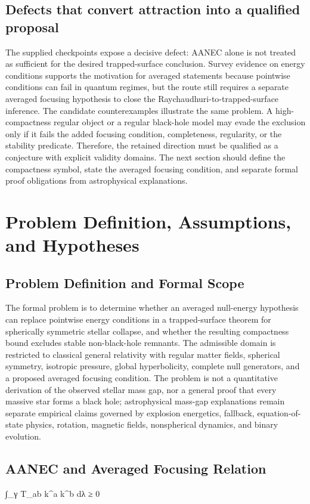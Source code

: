 \documentclass[conference]{IEEEtran}
\begin{document}
\subsection{Defects that convert attraction into a qualified proposal}
The supplied checkpoints expose a decisive defect: AANEC alone is not treated as sufficient for the desired trapped-surface conclusion. Survey evidence on energy conditions supports the motivation for averaged statements because pointwise conditions can fail in quantum regimes, but the route still requires a separate averaged focusing hypothesis to close the Raychaudhuri-to-trapped-surface inference. The candidate counterexamples illustrate the same problem. A high-compactness regular object or a regular black-hole model may evade the exclusion only if it fails the added focusing condition, completeness, regularity, or the stability predicate. Therefore, the retained direction must be qualified as a conjecture with explicit validity domains. The next section should define the compactness symbol, state the averaged focusing condition, and separate formal proof obligations from astrophysical explanations.~\cite{cite_0ed84243cf171bc4}

\section{Problem Definition, Assumptions, and Hypotheses}
\subsection{Problem Definition and Formal Scope}
The formal problem is to determine whether an averaged null-energy hypothesis can replace pointwise energy conditions in a trapped-surface theorem for spherically symmetric stellar collapse, and whether the resulting compactness bound excludes stable non-black-hole remnants. The admissible domain is restricted to classical general relativity with regular matter fields, spherical symmetry, isotropic pressure, global hyperbolicity, complete null generators, and a proposed averaged focusing condition. The problem is not a quantitative derivation of the observed stellar mass gap, nor a general proof that every massive star forms a black hole; astrophysical mass-gap explanations remain separate empirical claims governed by explosion energetics, fallback, equation-of-state physics, rotation, magnetic fields, nonspherical dynamics, and binary evolution.

\subsection{AANEC and Averaged Focusing Relation}
∫\_γ T\_ab k\textasciicircum{}a k\textasciicircum{}b dλ ≥ 0~\cite{cite_0ed84243cf171bc4}
\end{document}
